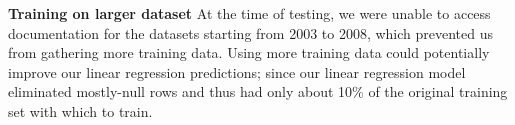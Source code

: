 \documentclass[english]{article}
\begin{document}
{\bf Training on larger dataset}
At the time of testing, we were unable to access documentation for the datasets starting from 2003 to 2008, which prevented us from gathering more training data. Using more training data could potentially improve our linear regression predictions; since our linear regression model eliminated mostly-null rows and thus had only about 10\% of the original training set with which to train.


\nocite{pope2007health}





\end{document}
